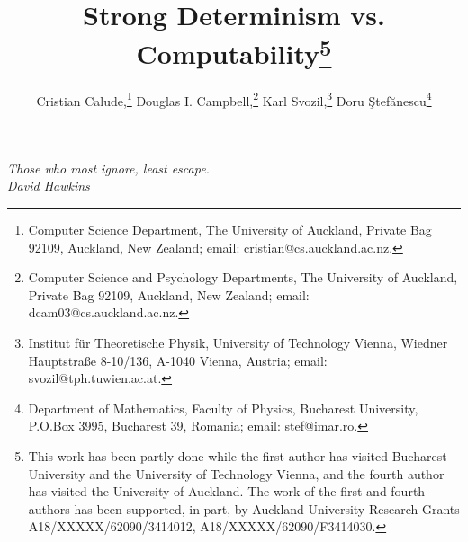 



\newcommand{\bbb}{$\spadesuit \spadesuit $}


\newcommand{\aaa}{$\spadesuit \heartsuit \spadesuit $}

\newcommand{\propersubset}{\subset}
\newcommand{\la}{\lambda}
\newcommand{\f}{\varphi}
\newcommand{\de}{\Delta}
\newcommand{\al}{\alpha}
\newcommand{\be}{\beta}
\newcommand{\e}{\in}
\newcommand{\th}{\theta}
\newcommand{\spq}{\stackrel{o}\rightarrow}
\newcommand{\s}{\rightarrow}
\newcommand{\N}{{\bf N}}
\newcommand{\R}{{\bf R}}
\newcommand{\PR}{{\bf PR}}
\newcommand{\FR}{{\bf FR}}
\newcommand{\FPRED}{{\bf FPRED}}
\newcommand{\RPRED}{{\bf RPRED}}
\newcommand{\UU}{{\cal U}}
\newcommand{\OO}{{\cal O}}
\newcommand{\x}{{\bf x}}
\newcommand{\SP}{\;}
\newcommand{\y}{{\bf y}}
\newcommand{\rem}{{\bf !!!! REMINDER }\\}
\newcommand{\COM}[2]{{#1 \choose #2}}
\newcommand{\ie}{\mbox{i.e.}}
\newcommand{\io}{\mbox{i.o.}}
\newcommand{\sstar}{{\Sigma^*}}
\newcommand{\sinf}{{\Sigma^\infty}}


\def\RR{I\!\!R}
\def\NN{I\!\!N}
\def\CC{I\!\!\!\!C}
\def\QQ{I\!\!\!\!Q}
\def\ZZ{Z\!\!\!Z}
\def\Ha{I\!\!H}
\def\FF{I\!\!F}
\def\Po{I\!\!P}
\def\TT{T\!\!\!T}
\def\L{{\cal L}}



\begin{flushright}
\it {Those who most ignore, least escape.}\\
David Hawkins
\end{flushright}


\bigskip

{\let\newpage\relax
\title{{\bf Strong Determinism vs.  Computability}\thanks{This work has
been partly done while
the first author has visited Bucharest University and
the University of Technology Vienna, and the fourth author has
visited the University of  Auckland. The work of the
        first and fourth authors has been
         supported, in part, by Auckland University Research Grants
         A18/XXXXX/62090/3414012, A18/XXXXX/62090/F3414030.}
          }
\author{Cristian Calude,\thanks{Computer Science Department, The University of
Auckland, Private Bag 92109, Auckland, New Zealand; email:
cristian@cs.auckland.ac.nz.}
\hspace*{2mm}
Douglas I. Campbell,\thanks{Computer Science and Psychology
 Departments, The University of
Auckland, Private Bag 92109, Auckland, New Zealand; email:
dcam03@cs.auckland.ac.nz.}
\hspace*{2mm}
 Karl Svozil,\thanks{Institut f\"ur Theoretische Physik,
   University of Technology Vienna,  Wiedner Hauptstra\ss e 8-10/136,
 A-1040 Vienna, Austria; email:  svozil@tph.tuwien.ac.at.}
 \hspace*{2mm}
Doru \c{S}tef\u anescu\thanks{Department of Mathematics, Faculty
of Physics, Bucharest University, P.O.Box 3995, Bucharest 39, Romania;
email:  stef@imar.ro.}
}


\maketitle}


